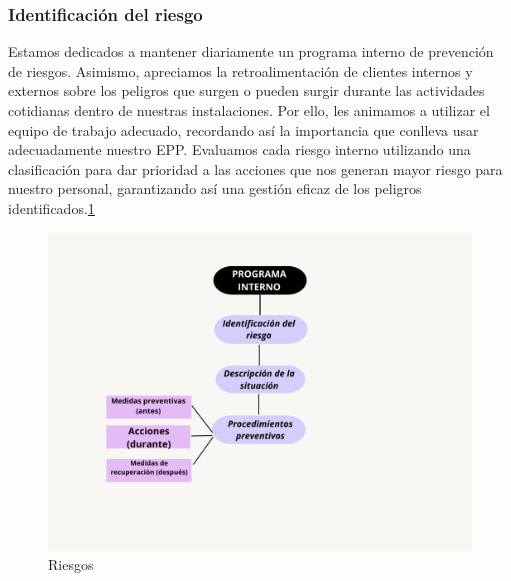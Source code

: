     \subsubsection{Identificación del riesgo}
    
    Estamos dedicados a mantener diariamente un programa interno de prevención de riesgos. Asimismo, apreciamos la retroalimentación de clientes internos y externos sobre los peligros que surgen o pueden surgir durante las actividades cotidianas dentro de nuestras instalaciones. Por ello, les animamos a utilizar el equipo de trabajo adecuado, recordando así la importancia que conlleva usar 
    adecuadamente nuestro EPP. Evaluamos cada riesgo interno utilizando una clasificación para dar prioridad a las acciones que nos generan mayor riesgo para nuestro personal, garantizando así una gestión eficaz de los peligros identificados.\ref{Riesgos}
    \begin{figure}[H]
        \centering
        \includegraphics[trim = {25mm 25mm 32mm 20mm},clip,scale=0.40]{16/Img/programainterno.pdf}
        \caption{Riesgos}
        \label{Riesgos}
    \end{figure}
    
